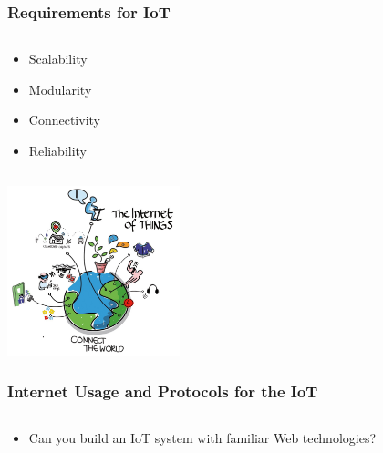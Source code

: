 \documentclass{beamer}
\begin{document}
\begin{frame}
	\frametitle{Requirements for IoT}
	\begin{columns}[c]
		\begin{column}{30cm}
			\vspace{.1cm}
			\begin{itemize}
				\justifying
				\item Scalability
				\item Modularity
				\item Connectivity
				\item Reliability
			\end{itemize}
		\end{column}
	\end{columns}
	\vspace{.5cm}
	\hspace*{5.5cm} \includegraphics[width=5cm]{figs/Internet-of-Things-3.jpg}
\end{frame}

\begin{frame}
	\frametitle{Internet Usage and Protocols for the IoT}
	\begin{columns}[c]
		\begin{column}{30cm}
			\vspace{.1cm}
			\begin{itemize}
				\justifying
				\item Can you build an IoT system with familiar Web technologies?
			\end{itemize}
		\end{column}
	\end{columns}
	\vspace{.5cm}
	\hspace*{5.5cm}
\end{frame}
\end{document}
